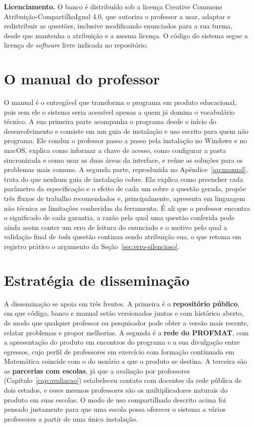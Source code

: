\textbf{Licenciamento.} O banco é distribuído sob a licença Creative Commons
Atribuição-CompartilhaIgual 4.0, que autoriza o professor a usar, adaptar e redistribuir as questões,
inclusive modificando enunciados para a sua turma, desde que mantenha a atribuição e a mesma licença.
O código do sistema segue a licença de \emph{software} livre indicada no repositório.

\section{O manual do professor}
\label{sec:produto-manual}

O manual é o entregável que transforma o programa em produto educacional, pois sem ele o sistema
seria acessível apenas a quem já domina o vocabulário técnico. A sua primeira parte acompanha o
programa desde o início do desenvolvimento e consiste em um guia de instalação e uso escrito para
quem não programa. Ele conduz o professor passo a passo pela instalação no Windows e no macOS,
explica como informar a chave de acesso, como configurar a pasta sincronizada e como usar as duas
áreas da interface, e reúne as soluções para os problemas mais comuns. A segunda parte, reproduzida
no Apêndice~\ref{ap:manual}, trata do que nenhum guia de instalação cobre. Ela explica como preencher
cada parâmetro da especificação e o efeito de cada um sobre a questão gerada, propõe três fluxos de
trabalho recomendados e, principalmente, apresenta em linguagem não técnica as limitações conhecidas
da ferramenta. É ali que o professor encontra o significado de cada garantia, a razão pela qual uma
questão conferida pode ainda assim conter um erro de leitura do enunciado e o motivo pelo qual a
validação final de \emph{toda} questão continua sendo atribuição sua, o que retoma em registro
prático o argumento da Seção~\ref{sec:erro-silencioso}.

\section{Estratégia de disseminação}
\label{sec:produto-disseminacao}

A disseminação se apoia em três frentes. A primeira é o \textbf{repositório público}, em que código,
banco e manual estão versionados juntos e com histórico aberto, de modo que qualquer professor ou
pesquisador pode obter a versão mais recente, relatar problemas e propor melhorias. A segunda é a
\textbf{rede do PROFMAT}, com a apresentação do produto em encontros do programa e a sua divulgação
entre egressos, cujo perfil de professores em exercício com formação continuada em Matemática
coincide com o do usuário a que o produto se destina. A terceira são as \textbf{parcerias com
escolas}, já que a avaliação por professores (Capítulo~\ref{cap:avaliacao}) estabeleceu contato com
docentes da rede pública de dois estados, e esses mesmos professores são os multiplicadores naturais
do produto em suas escolas. O modo de uso compartilhado descrito acima foi pensado justamente para
que uma escola possa oferecer o sistema a vários professores a partir de uma única instalação.

